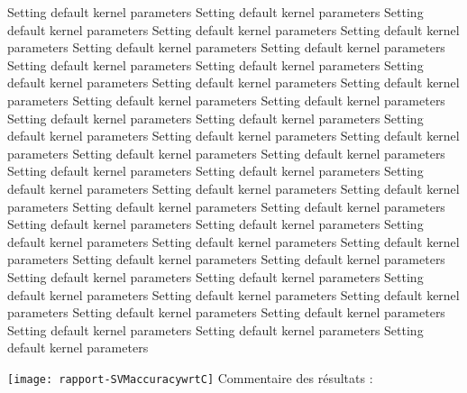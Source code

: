 \documentclass{article}
\begin{document}
\begin{Schunk}
\begin{Soutput}
 Setting default kernel parameters  
 Setting default kernel parameters  
 Setting default kernel parameters  
 Setting default kernel parameters  
 Setting default kernel parameters  
 Setting default kernel parameters  
 Setting default kernel parameters  
 Setting default kernel parameters  
 Setting default kernel parameters  
 Setting default kernel parameters  
 Setting default kernel parameters  
 Setting default kernel parameters  
 Setting default kernel parameters  
 Setting default kernel parameters  
 Setting default kernel parameters  
 Setting default kernel parameters  
 Setting default kernel parameters  
 Setting default kernel parameters  
 Setting default kernel parameters  
 Setting default kernel parameters  
 Setting default kernel parameters  
 Setting default kernel parameters  
 Setting default kernel parameters  
 Setting default kernel parameters  
 Setting default kernel parameters  
 Setting default kernel parameters  
 Setting default kernel parameters  
 Setting default kernel parameters  
 Setting default kernel parameters  
 Setting default kernel parameters  
 Setting default kernel parameters  
 Setting default kernel parameters  
 Setting default kernel parameters  
 Setting default kernel parameters  
 Setting default kernel parameters  
 Setting default kernel parameters  
 Setting default kernel parameters  
 Setting default kernel parameters  
 Setting default kernel parameters  
 Setting default kernel parameters  
 Setting default kernel parameters  
 Setting default kernel parameters  
 Setting default kernel parameters  
 Setting default kernel parameters  
 Setting default kernel parameters  
\end{Soutput}
\end{Schunk}
\texttt{[image: rapport-SVMaccuracywrtC]}
\newline
Commentaire des résultats :
\end{document}
